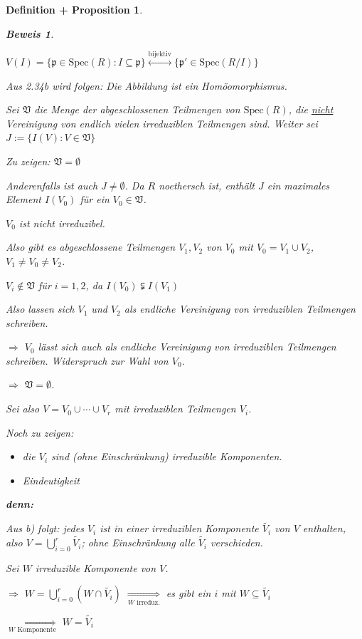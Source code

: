 \documentclass[a4paper,12pt]{scrbook}
\theoremstyle{break}
\newtheorem{DefProp}[Def]{Definition + Proposition}
\theoremstyle{nonumberbreak}
\newtheorem{Bew}{Beweis}
\theoremstyle{nonumberplain}
\begin{document}
\begin{DefProp}
\begin{Bew}
\begin{enumerate}
$V(I) = \{ \mathfrak{p} \in \textrm{Spec}(R) : I \subseteq \mathfrak{p} \} \overset{\text{bijektiv}}\longleftrightarrow \{ \mathfrak{p'} \in \textrm{Spec}(R/I) \}$

Aus 2.34b wird folgen: Die Abbildung ist ein Homöomorphismus.

Sei $\mathfrak{V}$ die Menge der abgeschlossenen Teilmengen von $\textrm{Spec}(R)$, die \underline{nicht} Vereinigung von endlich vielen irreduziblen Teilmengen sind. Weiter sei $J := \{ I(V) : V \in \mathfrak{V} \}$

Zu zeigen: $\mathfrak{V} = \emptyset$

Anderenfalls ist auch $J \neq \emptyset$. Da $R$ noethersch ist, enthält $J$ ein maximales Element $I(V_0)$ für ein $V_0 \in \mathfrak{V}$.

$V_0$ ist nicht irreduzibel.

Also gibt es abgeschlossene Teilmengen $V_1, V_2$ von $V_0$ mit $V_0 = V_1 \cup V_2$, $V_1 \neq V_0 \neq V_2$.

$V_i \notin \mathfrak{V}$ für $i = 1,2$, da $I(V_0) \subsetneqq I(V_1)$

Also lassen sich $V_1$ und $V_2$ als endliche Vereinigung von irreduziblen Teilmengen schreiben.

$\Rightarrow$ $V_0$ lässt sich auch als endliche Vereinigung von irreduziblen Teilmengen schreiben. Widerspruch zur Wahl von $V_0$.

$\Rightarrow$ $\mathfrak{V} = \emptyset$.
\bigskip

Sei also $V = V_0 \cup \cdots \cup V_r$ mit irreduziblen Teilmengen $V_i$.

Noch zu zeigen: 
\begin{itemize}
\item die $V_i$ sind (ohne Einschränkung) irreduzible Komponenten.
\item Eindeutigkeit
\end{itemize}

\textbf{denn:}

Aus b) folgt: jedes $V_i$ ist in einer irreduziblen Komponente $\widetilde{V_i}$ von $V$ enthalten, also $V = \bigcup_{i=0}^r \widetilde{V_i}$; ohne Einschränkung alle $\widetilde{V_i}$ verschieden.

Sei $W$ irreduzible Komponente von $V$.

$\Rightarrow$ $W = \bigcup_{i=0}^r (W \cap \widetilde{V_i})$ $\underset{W \text{ irreduz.}}\Rightarrow$ es gibt ein $i$ mit $W \subseteq \widetilde{V_i}$

$\underset{W \text{ Komponente}}\Rightarrow$ $W = \widetilde{V_i}$

\end{enumerate}
\end{Bew}

\end{DefProp}
\end{document}
